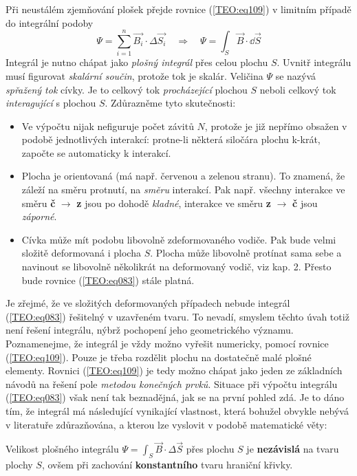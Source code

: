         Při neustálém zjemňování plošek přejde rovnice (\ref{TEO:eq109}) v limitním případě 
        do integrální podoby
        \begin{equation}\label{TEO:eq083}
          \Psi = \sum_{i=1}^n\vec{B_i}\cdot\Delta\vec{S_i} \quad\Longrightarrow\quad
          \Psi = \int_S\vec{B}\cdot \dd{\vec{S}}
        \end{equation}
        Integrál je nutno chápat jako \emph{plošný integrál} přes celou plochu \(S\). Uvnitř
        integrálu musí figurovat \emph{skalární součin}, protože tok je skalár. Veličina \(\Psi\) se
        nazývá \emph{spřažený tok} cívky. Je to celkový tok \emph{procházející} plochou \(S\) neboli
        celkový tok \emph{interagující} s plochou \(S\). Zdůrazněme tyto skutečnosti:
        \begin{itemize}[noitemsep]
          \item Ve výpočtu nijak nefiguruje počet závitů \(N\), protože je již nepřímo obsažen v 
                podobě jednotlivých interakcí: protne-li některá siločára plochu k-krát, započte se 
                automaticky k interakcí.
        
          \item Plocha je orientovaná (má např. červenou a zelenou stranu). To znamená, že záleží 
                na směru protnutí, na \emph{směru} interakcí. Pak např. všechny interakce ve směru 
                \textbf{č} \(\rightarrow\) \textbf{z} jsou po dohodě \emph{kladné}, interakce 
                ve směru \textbf{z} \(\rightarrow\) \textbf{č} jsou \emph{záporné}.
        
          \item Cívka může mít podobu libovolně zdeformovaného vodiče. Pak bude velmi složitě 
                deformovaná i plocha \(S\). Plocha může libovolně protínat sama sebe a navinout se 
                libovolně několikrát na deformovaný vodič, viz kap. 2. Přesto bude rovnice 
                (\ref{TEO:eq083}) stále platná.
      \end{itemize}
      
      Je zřejmé, že ve složitých deformovaných případech nebude integrál (\ref{TEO:eq083}) řešitelný
      v uzavřeném tvaru. To nevadí, smyslem těchto úvah totiž není řešení integrálu, nýbrž pochopení
      jeho geometrického významu. Poznamenejme, že integrál je vždy možno vyřešit numericky, pomocí
      rovnice (\ref{TEO:eq109}). Pouze je třeba rozdělit plochu na dostatečně malé plošné elementy.
      Rovnici (\ref{TEO:eq109}) je tedy možno chápat jako jeden ze základních návodů na řešení pole
      \emph{metodou konečných prvků}. Situace při výpočtu integrálu (\ref{TEO:eq083}) však není tak
      beznadějná, jak se na první pohled zdá. Je to dáno tím, že integrál má následující vynikající
      vlastnost, která bohužel obvykle nebývá v literatuře zdůrazňována, a kterou lze vyslovit v
      podobě matematické věty:
      \begin{lemma}\label{es:fig_patocka_lemma01}
        Velikost plošného integrálu \(\Psi = \int_S\vec{B}\cdot\Delta \vec{S}\) přes plochu \(S\) 
        je \textbf{nezávislá} na tvaru plochy \(S\), ovšem při zachování \textbf{konstantního} 
        tvaru hraniční křivky.
      \end{lemma}
      
